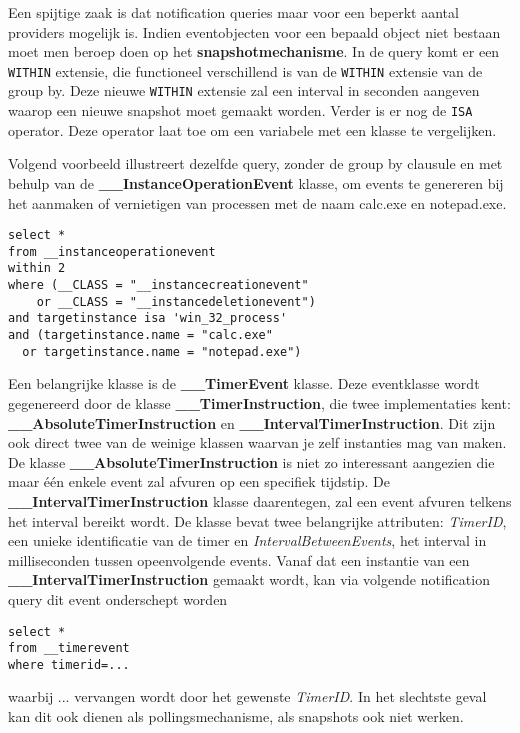 \documentclass{report}
\begin{document}
	Een spijtige zaak is dat notification queries maar voor een beperkt aantal providers mogelijk is. Indien eventobjecten voor een bepaald object niet bestaan moet men beroep doen op het \textbf{snapshotmechanisme}. In de query komt er een \texttt{WITHIN} extensie, die functioneel verschillend is van de \texttt{WITHIN} extensie van de group by. Deze nieuwe \texttt{WITHIN} extensie zal een interval in seconden aangeven waarop een nieuwe snapshot moet gemaakt worden. Verder is er nog de \texttt{ISA} operator. Deze operator laat toe om een variabele met een klasse te vergelijken.
	
	Volgend voorbeeld illustreert dezelfde query, zonder de group by clausule en met behulp van de \textbf{\_\_InstanceOperationEvent} klasse, om events te genereren bij het aanmaken of vernietigen van processen met de naam calc.exe en notepad.exe.
	\begin{lstlisting}
select *
from __instanceoperationevent 
within 2
where (__CLASS = "__instancecreationevent"
    or __CLASS = "__instancedeletionevent")
and targetinstance isa 'win_32_process'
and (targetinstance.name = "calc.exe" 
  or targetinstance.name = "notepad.exe")

	\end{lstlisting}
	
	Een belangrijke klasse is de \textbf{\_\_TimerEvent} klasse. Deze eventklasse wordt gegenereerd door de klasse \textbf{\_\_TimerInstruction}, die twee implementaties kent: \textbf{\_\_AbsoluteTimerInstruction} en \textbf{\_\_IntervalTimerInstruction}. Dit zijn ook direct twee van de weinige klassen waarvan je zelf instanties mag van maken. De klasse \textbf{\_\_AbsoluteTimerInstruction} is niet zo interessant aangezien die maar één enkele event zal afvuren op een specifiek tijdstip. De \textbf{\_\_IntervalTimerInstruction} klasse daarentegen, zal een event afvuren telkens het interval bereikt wordt. De klasse bevat twee belangrijke attributen: \textit{TimerID}, een unieke identificatie van de timer en \textit{IntervalBetweenEvents}, het interval in milliseconden tussen opeenvolgende events. Vanaf dat een instantie van een \textbf{\_\_IntervalTimerInstruction} gemaakt wordt, kan via volgende notification query dit event onderschept worden
	\begin{lstlisting}
select *
from __timerevent
where timerid=...
	\end{lstlisting}
	waarbij ... vervangen wordt door het gewenste \textit{TimerID}. In het slechtste geval kan dit ook dienen als pollingsmechanisme, als snapshots ook niet werken.
	
\end{document}
